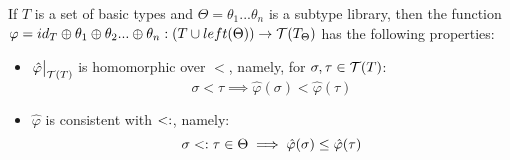 \documentclass[main.tex]{subfiles}
\begin{document}
\begin{prop}
    If $T$ is a set of basic types and
    $\Theta = \theta_1 ... \theta_n$ is a subtype library, then the function
    $\varphi = id_T \oplus \theta_1 \oplus \theta_2 ... \oplus \theta_n:
     (T \cup left(\Theta)) \rightarrow \mathcal{T}( T_{\Theta} )$
    has the following properties:
    \begin{itemize}
        \item $\restr{\hat{\varphi}}{\tclos{T}}$ is homomorphic over $\less$, namely, for
            $\sigma, \tau \in \mathcal{T}( T )$:
            \[ \sigma \less \tau \implies
                \hat{\varphi}(\sigma) \less \hat{\varphi}(\tau) \]
        \item $\hat{\varphi}$ is consistent with $<:$, namely:
            \[ \sigma <: \tau \in \Theta \implies
                \hat{\varphi}(\sigma) \leq \hat{\varphi}(\tau) \]
    \end{itemize}
\end{prop}
\end{document}
